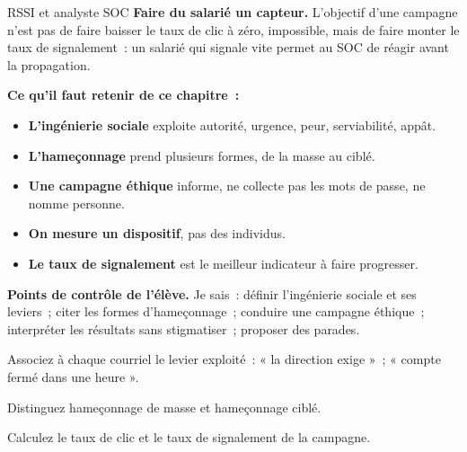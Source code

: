 \begin{boxmetier}{RSSI et analyste SOC}
\textbf{Faire du salarié un capteur.} L'objectif d'une campagne n'est pas de
faire baisser le taux de clic à zéro, impossible, mais de faire monter le
taux de signalement~: un salarié qui signale vite permet au SOC de réagir
avant la propagation.
\end{boxmetier}

\separateur

\begin{boxresume}
\textbf{Ce qu'il faut retenir de ce chapitre~:}
\begin{itemize}
    \item \textbf{L'ingénierie sociale} exploite autorité, urgence, peur,
          serviabilité, appât.
    \item \textbf{L'hameçonnage} prend plusieurs formes, de la masse au
          ciblé.
    \item \textbf{Une campagne éthique} informe, ne collecte pas les mots de
          passe, ne nomme personne.
    \item \textbf{On mesure un dispositif}, pas des individus.
    \item \textbf{Le taux de signalement} est le meilleur indicateur à faire
          progresser.
\end{itemize}
\end{boxresume}

\begin{boxinfo}
\textbf{Points de contrôle de l'élève.} Je sais~: définir l'ingénierie
sociale et ses leviers~; citer les formes d'hameçonnage~; conduire une
campagne éthique~; interpréter les résultats sans stigmatiser~; proposer des
parades.
\end{boxinfo}

\bigskip

\begin{boxexo}[title={\ding{45}\quad Exercice~19.1. Leviers \niveaubase}]
Associez à chaque courriel le levier exploité~: « la direction exige »~;
« compte fermé dans une heure ».
\end{boxexo}

\begin{boxexo}[title={\ding{45}\quad Exercice~19.2. Formes \niveaubase}]
Distinguez hameçonnage de masse et hameçonnage ciblé.
\end{boxexo}

\begin{boxexo}[title={\ding{45}\quad Exercice~19.3. Taux \niveaubase}]
Calculez le taux de clic et le taux de signalement de la campagne.
\end{boxexo}

